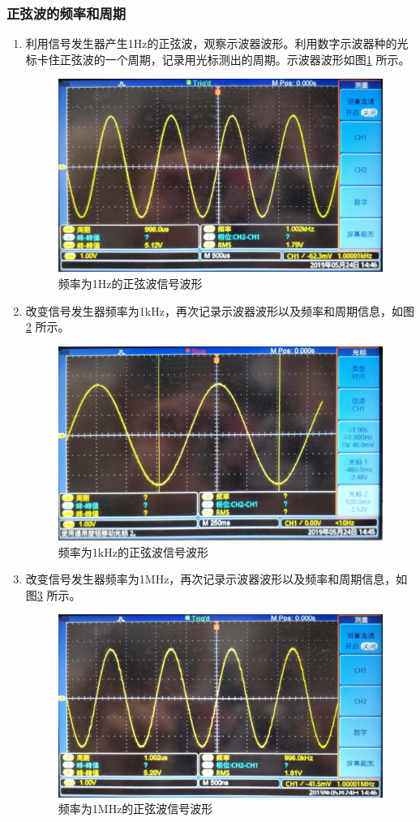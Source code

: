 \documentclass[12pt]{article}
\begin{document}
\subsubsection{正弦波的频率和周期}
\begin{enumerate}
  \item 利用信号发生器产生1Hz的正弦波，观察示波器波形。利用数字示波器种的光标卡住正弦波的一个周期，记录用光标测出的周期。示波器波形如图\ref{zx1hz}
  所示。
  \begin{figure}[htbp]
    \centering
    \includegraphics[width=.5\textwidth]{P005}
    \caption{频率为1Hz的正弦波信号波形}\label{zx1hz}
  \end{figure}
\item 改变信号发生器频率为1kHz，再次记录示波器波形以及频率和周期信息，如图\ref{zx1khz}
所示。
  \begin{figure}[htbp]
    \centering
    \includegraphics[width=.5\textwidth]{P025}
    \caption{频率为1kHz的正弦波信号波形}\label{zx1khz}
  \end{figure}
\item 改变信号发生器频率为1MHz，再次记录示波器波形以及频率和周期信息，如图\ref{zx1mhz}
所示。
  \begin{figure}[htbp]
    \centering
    \includegraphics[width=.5\textwidth]{P020}
    \caption{频率为1MHz的正弦波信号波形}\label{zx1mhz}
  \end{figure}
\end{enumerate}
\end{document}
